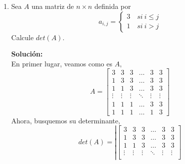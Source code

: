 \documentclass[12pt]{article}
\newenvironment{solucion}
{\begin{mdframed}[backgroundcolor=black!10]
		{\bf Solución:}\\
	}
	{
	\end{mdframed}
}
\newenvironment{preguntas}
{\begin{enumerate}\itemsep12pt
	}
	{
	\end{enumerate}
}
\newcommand{\ra}{\rightarrow}
\begin{document}
\begin{preguntas}
\begin{solucion}
\begin{enumerate}[a)]
\item Calcule el determinante de la matriz $A^3$ mediante desarrollo por cofactores.\\
\\
$$|A^3| = \left|\begin{bmatrix}
2 & 0 & 2\\
-1 & 1 & 2\\
2 & -1 & -1
\end{bmatrix}\right| = 2\left|\begin{bmatrix}
1 & 2\\
-1 & -1
\end{bmatrix}\right| + 2\left|\begin{bmatrix}
1 & 2\\
-1 & -1
\end{bmatrix}\right| = 2 - 2 = 0$$
\item Demuestre que $A$ no es invertible.\\
\\
$$|A^3| = 0 \ra |A|^3 = 0 \ra |A| = 0$$
Por lo que la matriz no es invertible.
\end{enumerate}
\end{solucion}
\item Sea $A$ una matriz de $n \times n$ definida por
	$$a_{i,j} = 
	\begin{cases}
	3 \quad si\ i\leq j \\
	1 \quad si\ i > j
	\end{cases}$$
	Calcule $det(A)$.
\begin{solucion}
En primer lugar, veamos como es $A$,
		$$A = \begin{bmatrix}
		3 & 3 & 3 & \dots & 3 & 3 \\ 
		1 & 3 & 3 & \dots & 3 & 3 \\ 
		1 & 1 & 3 & \dots & 3 & 3 \\ 
		\vdots & \vdots & \vdots & \ddots & \vdots & \vdots \\ 
		1 & 1 & 1 & \dots & 3 & 3 \\ 
		1 & 1 & 1 & \dots & 1 & 3
		\end{bmatrix}$$
		Ahora, busquemos su determinante,
		$$det(A) = \left|\begin{bmatrix}
		3 & 3 & 3 & \dots & 3 & 3 \\ 
		1 & 3 & 3 & \dots & 3 & 3 \\ 
		1 & 1 & 3 & \dots & 3 & 3 \\ 
		\vdots & \vdots & \vdots & \ddots & \vdots & \vdots \\ 

\end{bmatrix}$$
\end{solucion}
\end{preguntas}
\end{document}
